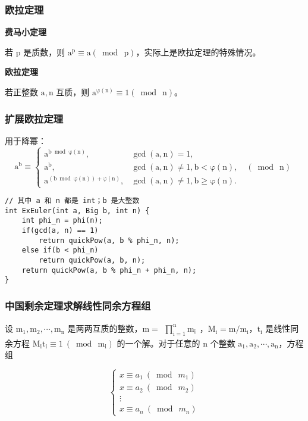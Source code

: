 \documentclass[UTF8]{article}
\begin{document}
\subsubsection{欧拉定理}
\noindent \textbf{费马小定理}

若 $\mathrm{p}$ 是质数，则 $\mathrm{a^p \equiv a (\bmod\  p)}$，实际上是欧拉定理的特殊情况。

\noindent \textbf{欧拉定理}

若正整数 $\mathrm{a, n}$ 互质，则 $\mathrm{a^{\varphi(n)} \equiv 1(\bmod \ n)}$。


\subsubsection{扩展欧拉定理}
用于降幂：
$$
\mathrm{a^b \equiv \begin{cases}a^{b \bmod \varphi(n)}, & \operatorname{gcd}(a, n)=1, \\ a^b, & \operatorname{gcd}(a, n) \neq 1, b<\varphi(n), \quad(\bmod\  n) \\ a^{(b \bmod \varphi(n))+\varphi(n)}, & \operatorname{gcd}(a, n) \neq 1, b \geq \varphi(n) .\end{cases}}
$$
\begin{lstlisting}[caption=扩展欧拉定理]
// 其中 a 和 n 都是 int；b 是大整数
int ExEuler(int a, Big b, int n) {
    int phi_n = phi(n);
    if(gcd(a, n) == 1) 
        return quickPow(a, b % phi_n, n);
    else if(b < phi_n) 
        return quickPow(a, b, n);
    return quickPow(a, b % phi_n + phi_n, n);
}
\end{lstlisting}


\subsubsection{中国剩余定理求解线性同余方程组}
设 $\mathrm{m_1, m_2, \cdots , m_n}$ 是两两互质的整数，$\mathrm{m = \begin{matrix} \prod_{i = 1}^n m_i \end{matrix}}$，$\mathrm{M_i =m / m_i}$，$\mathrm{t_i}$ 是线性同余方程 $\mathrm{M_it_i \equiv 1\ (\bmod \ m_i)}$ 的一个解。对于任意的 $\mathrm{n}$ 个整数 $\mathrm{a_1, a_2, \cdots, a_n}$，方程组

$$
\begin{cases} 
x \equiv a_1\ (\bmod \ m_1) \\
x \equiv a_2\ (\bmod \ m_2) \\
\vdots \\
x \equiv a_n\ (\bmod \ m_n)
\end{cases}
$$
\end{document}
